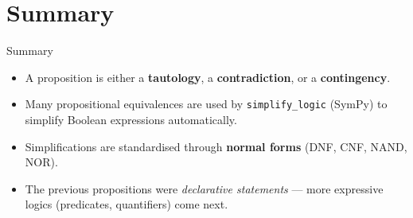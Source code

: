 \documentclass[aspectratio=169]{beamer}
\begin{document}
\section{Summary}

\begin{frame}{Summary}
  \begin{itemize}
    \item A proposition is either a
          \textcolor{dmOrange}{\textbf{tautology}},
          a \textcolor{dmOrange}{\textbf{contradiction}}, or a
          \textcolor{dmOrange}{\textbf{contingency}}.
    \pause
    \item Many propositional equivalences are used by
          \texttt{simplify\_logic} (SymPy) to simplify Boolean expressions
          automatically.
    \pause
    \item Simplifications are standardised through
          \textcolor{dmOrange}{\textbf{normal forms}}
          (DNF, CNF, NAND, NOR).
    \pause
    \item The previous propositions were \emph{declarative statements}
          — more expressive logics (predicates, quantifiers) come next.
  \end{itemize}
\end{frame}
\end{document}
